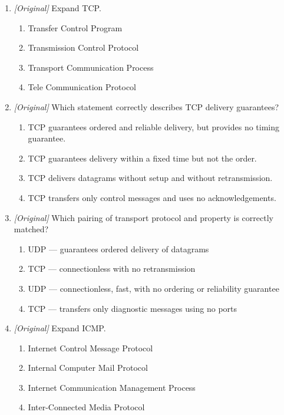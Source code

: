 \begin{enumerate}[label=\textbf{Q\arabic*.}, leftmargin=*]
\item \textit{[Original]} Expand TCP.
  \begin{enumerate}[label=\Alph*.]
    \item Transfer Control Program
    \item Transmission Control Protocol
    \item Transport Communication Process
    \item Tele Communication Protocol
  \end{enumerate}
\item \textit{[Original]} Which statement correctly describes TCP delivery
  guarantees?
  \begin{enumerate}[label=\Alph*.]
    \item TCP guarantees ordered and reliable delivery, but provides no timing
      guarantee.
    \item TCP guarantees delivery within a fixed time but not the order.
    \item TCP delivers datagrams without setup and without retransmission.
    \item TCP transfers only control messages and uses no acknowledgements.
  \end{enumerate}
\item \textit{[Original]} Which pairing of transport protocol and property is
  correctly matched?
  \begin{enumerate}[label=\Alph*.]
    \item UDP --- guarantees ordered delivery of datagrams
    \item TCP --- connectionless with no retransmission
    \item UDP --- connectionless, fast, with no ordering or reliability
      guarantee
    \item TCP --- transfers only diagnostic messages using no ports
  \end{enumerate}
\item \textit{[Original]} Expand ICMP.
  \begin{enumerate}[label=\Alph*.]
    \item Internet Control Message Protocol
    \item Internal Computer Mail Protocol
    \item Internet Communication Management Process
    \item Inter-Connected Media Protocol
  \end{enumerate}

\end{enumerate}
